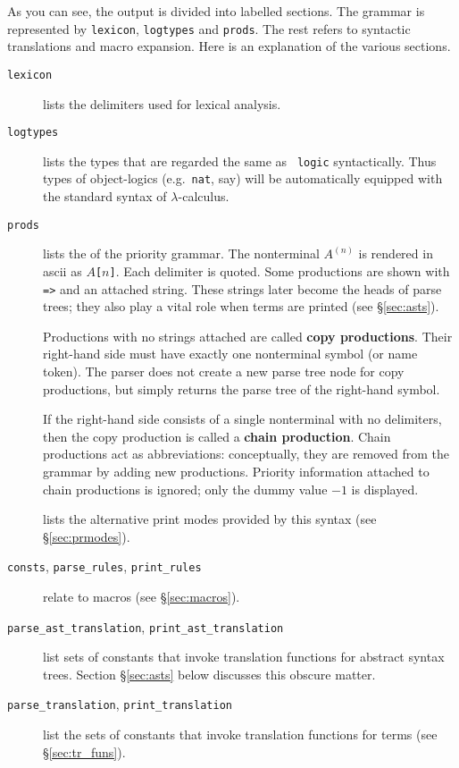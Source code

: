 As you can see, the output is divided into labelled sections.  The grammar
is represented by {\tt lexicon}, {\tt logtypes} and {\tt prods}.  The rest
refers to syntactic translations and macro expansion.  Here is an
explanation of the various sections.
\begin{description}
  \item[{\tt lexicon}] lists the delimiters used for lexical
    analysis.

  \item[{\tt logtypes}] lists the types that are regarded the same as {\tt
    logic} syntactically.  Thus types of object-logics (e.g.\ {\tt nat}, say)
    will be automatically equipped with the standard syntax of
    $\lambda$-calculus.

  \item[{\tt prods}] lists the  of the priority grammar.
    The nonterminal $A^{(n)}$ is rendered in {\sc ascii} as {\tt $A$[$n$]}.
    Each delimiter is quoted.  Some productions are shown with {\tt =>} and
    an attached string.  These strings later become the heads of parse
    trees; they also play a vital role when terms are printed (see
    \S\ref{sec:asts}).

    Productions with no strings attached are called {\bf copy
      productions}.  Their right-hand side must
    have exactly one nonterminal symbol (or name token).  The parser does
    not create a new parse tree node for copy productions, but simply
    returns the parse tree of the right-hand symbol.

    If the right-hand side consists of a single nonterminal with no
    delimiters, then the copy production is called a {\bf chain
      production}.  Chain productions act as abbreviations:
    conceptually, they are removed from the grammar by adding new
    productions.  Priority information attached to chain productions is
    ignored; only the dummy value $-1$ is displayed.
    
  \item[] lists the alternative print modes
    provided by this syntax (see \S\ref{sec:prmodes}).

  \item[{\tt consts}, {\tt parse_rules}, {\tt print_rules}]
    relate to macros (see \S\ref{sec:macros}).

  \item[{\tt parse_ast_translation}, {\tt print_ast_translation}]
    list sets of constants that invoke translation functions for abstract
    syntax trees.  Section \S\ref{sec:asts} below discusses this obscure
    matter.

  \item[{\tt parse_translation}, {\tt print_translation}] list the sets
    of constants that invoke translation functions for terms (see
    \S\ref{sec:tr_funs}).
\end{description}


